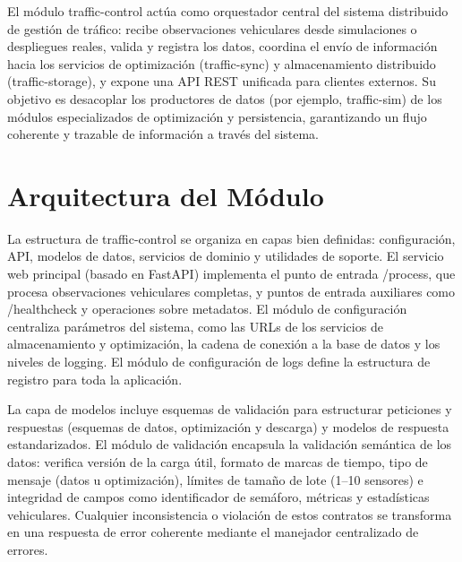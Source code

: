 \label{sec:traffic_control}

El módulo traffic-control actúa como orquestador central del sistema distribuido de gestión de tráfico: recibe observaciones vehiculares desde simulaciones o despliegues reales, valida y registra los datos, coordina el envío de información hacia los servicios de optimización (traffic-sync) y almacenamiento distribuido (traffic-storage), y expone una API REST unificada para clientes externos. Su objetivo es desacoplar los productores de datos (por ejemplo, traffic-sim) de los módulos especializados de optimización y persistencia, garantizando un flujo coherente y trazable de información a través del sistema.

\section{Arquitectura del Módulo}
\label{subsec:traffic_control_architecture}

La estructura de traffic-control se organiza en capas bien definidas: configuración, API, modelos de datos, servicios de dominio y utilidades de soporte. El servicio web principal (basado en FastAPI) implementa el punto de entrada /process, que procesa observaciones vehiculares completas, y puntos de entrada auxiliares como /healthcheck y operaciones sobre metadatos. El módulo de configuración centraliza parámetros del sistema, como las URLs de los servicios de almacenamiento y optimización, la cadena de conexión a la base de datos y los niveles de logging. El módulo de configuración de logs define la estructura de registro para toda la aplicación.

La capa de modelos incluye esquemas de validación para estructurar peticiones y respuestas (esquemas de datos, optimización y descarga) y modelos de respuesta estandarizados. El módulo de validación encapsula la validación semántica de los datos: verifica versión de la carga útil, formato de marcas de tiempo, tipo de mensaje (datos u optimización), límites de tamaño de lote (1–10 sensores) e integridad de campos como identificador de semáforo, métricas y estadísticas vehiculares. Cualquier inconsistencia o violación de estos contratos se transforma en una respuesta de error coherente mediante el manejador centralizado de errores.

